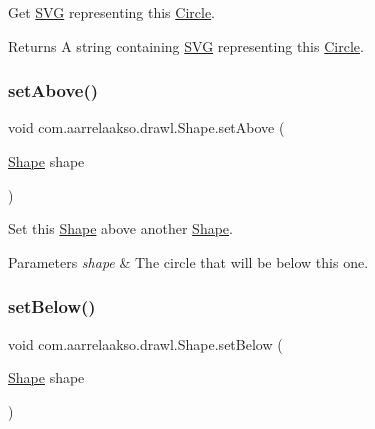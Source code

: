 Get \hyperlink{classcom_1_1aarrelaakso_1_1drawl_1_1_s_v_g}{S\+VG} representing this \hyperlink{classcom_1_1aarrelaakso_1_1drawl_1_1_circle}{Circle}.

\begin{DoxyReturn}{Returns}
A string containing \hyperlink{classcom_1_1aarrelaakso_1_1drawl_1_1_s_v_g}{S\+VG} representing this \hyperlink{classcom_1_1aarrelaakso_1_1drawl_1_1_circle}{Circle}. 
\end{DoxyReturn}
\mbox{\label{classcom_1_1aarrelaakso_1_1drawl_1_1_shape_a942b3cf3365498dc1ac6b0309ce33b86}} 
\subsubsection{\texorpdfstring{set\+Above()}{setAbove()}}
{\footnotesize\ttfamily void com.\+aarrelaakso.\+drawl.\+Shape.\+set\+Above (\begin{DoxyParamCaption}\item[{\hyperlink{classcom_1_1aarrelaakso_1_1drawl_1_1_shape}{Shape}}]{shape }\end{DoxyParamCaption})\hspace{0.3cm}{\ttfamily [inherited]}}

Set this \hyperlink{classcom_1_1aarrelaakso_1_1drawl_1_1_shape}{Shape} above another \hyperlink{classcom_1_1aarrelaakso_1_1drawl_1_1_shape}{Shape}.


\begin{DoxyParams}{Parameters}
{\em shape} & The circle that will be below this one. \\
\hline
\end{DoxyParams}
\mbox{\label{classcom_1_1aarrelaakso_1_1drawl_1_1_shape_aa0ec0030515b5096820e4dd030c0b320}} 
\subsubsection{\texorpdfstring{set\+Below()}{setBelow()}}
{\footnotesize\ttfamily void com.\+aarrelaakso.\+drawl.\+Shape.\+set\+Below (\begin{DoxyParamCaption}\item[{\hyperlink{classcom_1_1aarrelaakso_1_1drawl_1_1_shape}{Shape}}]{shape }\end{DoxyParamCaption})\hspace{0.3cm}{\ttfamily [inherited]}}

